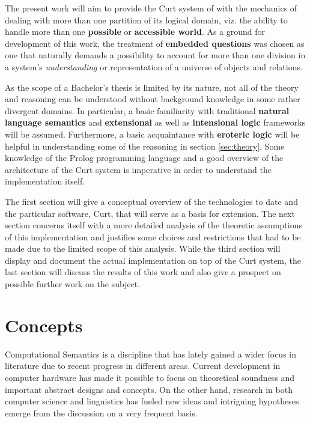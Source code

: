 \documentclass[11pt,a4paper]{article}
\newcommand{\term}[1]{\textsf{\textbf{#1}}} %
\newcommand{\pn}{\textsf} %
\newcommand{\curt}{\pn{Curt}}
\newcommand{\prol}{\pn{Prolog}}
\theoremstyle{remark}
\theoremstyle{remark}
\theoremstyle{definition}
\begin{document}
The present work will aim to provide the \curt{} system of
\cite{blackburnbos:cl1} with the mechanics of dealing with more than one
partition of its logical domain, viz. the ability to handle more than one
\term{possible} or \term{accessible world}. As a ground for development of this
work, the treatment of \term{embedded questions} was chosen as one that
naturally demands a possibility to account for more than one division in a
system's \emph{understanding} or representation of a universe of objects and
relations.

As the scope of a Bachelor's thesis is limited by its nature, not all of the
theory and reasoning can be understood without background knowledge in some
rather divergent domains. In particular, a basic familiarity with traditional
\term{natural language semantics} and \term{extensional} as well as
\term{intensional logic} frameworks will be assumed. Furthermore, a basic
acquaintance with \term{eroteric logic} will be helpful in understanding some of
the reasoning in section \ref{sec:theory}.
Some knowledge of the \prol{} programming language and a good overview of the
architecture of the \curt{} system is imperative in order to understand the
implementation itself.

The first section will give a conceptual overview of the technologies to date
and the particular software, \curt, that will serve as a basis for extension.
The next section concerns itself with a more detailed analysis of the theoretic
assumptions of this implementation and justifies some choices and restrictions
that had to be made due to the limited scope of this analysis. While the
third section will display and document the actual implementation on top of the
\curt{} system, the last section will discuss the results of this work and also
give a prospect on possible further work on the subject.


\section{Concepts}

Computational Semantics is a discipline that has  lately gained a wider
focus in literature due to recent progress in different areas.
Current development in computer hardware has made it possible to focus on
theoretical soundness and important abstract designs and concepts. On the other
hand, research in both computer science and linguistics has fueled new ideas and
intriguing hypotheses emerge from the discussion on a very frequent basis.
\end{document}
